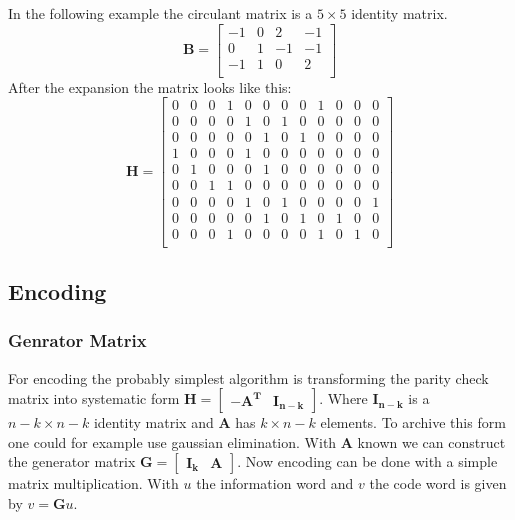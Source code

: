 In the following example the circulant matrix is a $5\times 5$ identity matrix. 
\begin{equation}
	\bm{B} = \left[\begin{matrix}
		-1 & 0 & 2 & -1\\
		0 & 1 & -1 & -1\\
		-1 & 1 & 0 & 2\\
	\end{matrix}\right]
\end{equation}
After the expansion the matrix looks like this:
\setcounter{MaxMatrixCols}{20}
\begin{equation}
	\bm{H} = \left[\begin{matrix}
		0 & 0 & 0 & 1 & 0 & 0 & 0 & 0 & 1 & 0 & 0 & 0 \\
		0 & 0 & 0 & 0 & 1 & 0 & 1 & 0 & 0 & 0 & 0 & 0 \\
		0 & 0 & 0 & 0 & 0 & 1 & 0 & 1 & 0 & 0 & 0 & 0 \\
		1 & 0 & 0 & 0 & 1 & 0 & 0 & 0 & 0 & 0 & 0 & 0 \\
		0 & 1 & 0 & 0 & 0 & 1 & 0 & 0 & 0 & 0 & 0 & 0 \\
		0 & 0 & 1 & 1 & 0 & 0 & 0 & 0 & 0 & 0 & 0 & 0 \\
		0 & 0 & 0 & 0 & 1 & 0 & 1 & 0 & 0 & 0 & 0 & 1 \\
		0 & 0 & 0 & 0 & 0 & 1 & 0 & 1 & 0 & 1 & 0 & 0 \\
		0 & 0 & 0 & 1 & 0 & 0 & 0 & 0 & 1 & 0 & 1 & 0 \\		
	\end{matrix}\right]
\end{equation}

\subsection{Encoding}
\subsubsection{Genrator Matrix}
For encoding the probably simplest algorithm is transforming the parity check matrix into systematic form $\bm{H} = \left[\begin{matrix} \bm{-A^T} & \bm{I_{n-k}}\end{matrix}\right]$. Where $\bm{I_{n-k}}$ is a $n-k \times n - k$ identity matrix and $\bm{A}$ has $k \times n - k$ elements. To archive this form one could for example use gaussian elimination. With $\bm{A}$ known we can construct the generator matrix $\bm{G} = \left[\begin{matrix} \bm{I_{k}} & \bm{A} \end{matrix}\right]$. Now encoding can be done with a simple matrix multiplication. With $u$ the information word and $v$ the code word is given by $v = \bm{G}u$.

